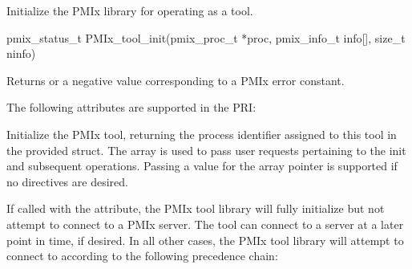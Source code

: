 \summary

Initialize the \ac{PMIx} library for operating as a tool.

\format

\cspecificstart
\begin{codepar}
pmix_status_t
PMIx_tool_init(pmix_proc_t *proc,
               pmix_info_t info[], size_t ninfo)
\end{codepar}
\cspecificend

\begin{arglist}
\end{arglist}

Returns  or a negative value corresponding to a PMIx error constant.

\priattr
The following attributes are supported in the \ac{PRI}:


\descr

Initialize the \ac{PMIx} tool, returning the process identifier assigned to this tool in the provided  struct. The  array is used to pass user requests pertaining to the init and subsequent operations. Passing a  value for the array pointer is supported if no directives are desired.

If called with the  attribute, the \ac{PMIx} tool library will fully initialize but not attempt to connect to a \ac{PMIx} server. The tool can connect to a server at a later point in time, if desired. In all other cases, the \ac{PMIx} tool library will attempt to connect to according to the following precedence chain:

